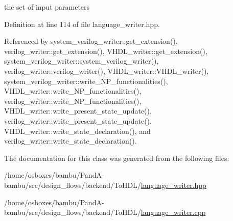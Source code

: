 the set of input parameters 



Definition at line 114 of file language\+\_\+writer.\+hpp.



Referenced by system\+\_\+verilog\+\_\+writer\+::get\+\_\+extension(), verilog\+\_\+writer\+::get\+\_\+extension(), V\+H\+D\+L\+\_\+writer\+::get\+\_\+extension(), system\+\_\+verilog\+\_\+writer\+::system\+\_\+verilog\+\_\+writer(), verilog\+\_\+writer\+::verilog\+\_\+writer(), V\+H\+D\+L\+\_\+writer\+::\+V\+H\+D\+L\+\_\+writer(), system\+\_\+verilog\+\_\+writer\+::write\+\_\+\+N\+P\+\_\+functionalities(), V\+H\+D\+L\+\_\+writer\+::write\+\_\+\+N\+P\+\_\+functionalities(), verilog\+\_\+writer\+::write\+\_\+\+N\+P\+\_\+functionalities(), V\+H\+D\+L\+\_\+writer\+::write\+\_\+present\+\_\+state\+\_\+update(), verilog\+\_\+writer\+::write\+\_\+present\+\_\+state\+\_\+update(), V\+H\+D\+L\+\_\+writer\+::write\+\_\+state\+\_\+declaration(), and verilog\+\_\+writer\+::write\+\_\+state\+\_\+declaration().



The documentation for this class was generated from the following files\+:\begin{DoxyCompactItemize}
\item 
/home/osboxes/bambu/\+Pand\+A-\/bambu/src/design\+\_\+flows/backend/\+To\+H\+D\+L/\hyperlink{language__writer_8hpp}{language\+\_\+writer.\+hpp}\item 
/home/osboxes/bambu/\+Pand\+A-\/bambu/src/design\+\_\+flows/backend/\+To\+H\+D\+L/\hyperlink{language__writer_8cpp}{language\+\_\+writer.\+cpp}\end{DoxyCompactItemize}
